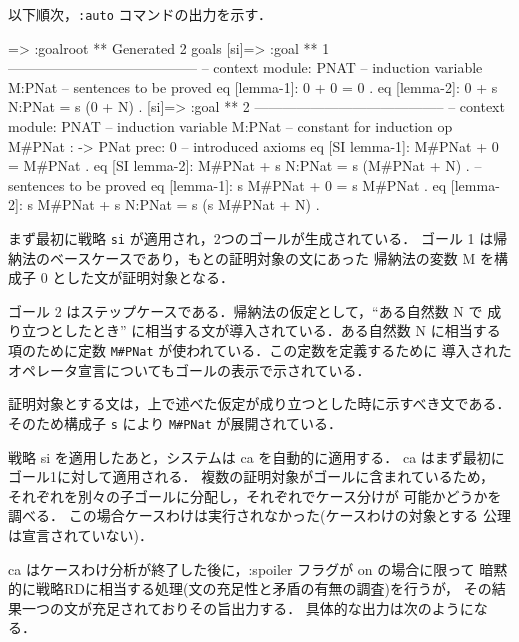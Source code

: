 \documentclass[a4paper,oneside,10pt,here]{memoir}
\newenvironment{vvtm}%
{\parskip=0pt\lineskip=0pt\begin{center}\begin{minipage}{0.8\textwidth}\begin{snugshade}}%
  {\end{snugshade}\end{minipage}\end{center}}
\begin{document}
以下順次，\texttt{:auto} コマンドの出力を示す．
\begin{vvtm}
  \begin{simplev}
[si]=> :goal{root}
** Generated 2 goals
[si]=>
:goal { ** 1 -----------------------------------------
  -- context module: PNAT
  -- induction variable
    M:PNat
  -- sentences to be proved
    eq [lemma-1]: 0 + 0 = 0 .
    eq [lemma-2]: 0 + s N:PNat = s (0 + N) .
}
[si]=>
:goal { ** 2 -----------------------------------------
  -- context module: PNAT
  -- induction variable
    M:PNat
  -- constant for induction
    op M#PNat : -> PNat { prec: 0 }
  -- introduced axioms
    eq [SI lemma-1]: M#PNat + 0 = M#PNat .
    eq [SI lemma-2]: M#PNat + s N:PNat = s (M#PNat + N) .
  -- sentences to be proved
    eq [lemma-1]: s M#PNat + 0 = s M#PNat .
    eq [lemma-2]: s M#PNat + s N:PNat = s (s M#PNat + N) .
}
\end{simplev}
\end{vvtm}
まず最初に戦略 \texttt{si} が適用され，2つのゴールが生成されている．
ゴール 1 は帰納法のベースケースであり，もとの証明対象の文にあった
帰納法の変数 M を構成子 0 とした文が証明対象となる．

ゴール 2 はステップケースである．帰納法の仮定として，``ある自然数 N で
成り立つとしたとき'' に相当する文が導入されている．ある自然数 N に相当する
項のために定数 \verb|M#PNat| が使われている．この定数を定義するために
導入されたオペレータ宣言についてもゴールの表示で示されている．

証明対象とする文は，上で述べた仮定が成り立つとした時に示すべき文である．
そのため構成子 \texttt{s} により \verb|M#PNat| が展開されている．

戦略 si を適用したあと，システムは ca を自動的に適用する．
ca はまず最初にゴール1に対して適用される．
複数の証明対象がゴールに含まれているため，
それぞれを別々の子ゴールに分配し，それぞれでケース分けが
可能かどうかを調べる．
この場合ケースわけは実行されなかった(ケースわけの対象とする
公理は宣言されていない)．

ca はケースわけ分析が終了した後に，:spoiler フラグが on の場合に限って
暗黙的に戦略RDに相当する処理(文の充足性と矛盾の有無の調査)を行うが，
その結果一つの文が充足されておりその旨出力する．
具体的な出力は次のようになる．
\end{document}
